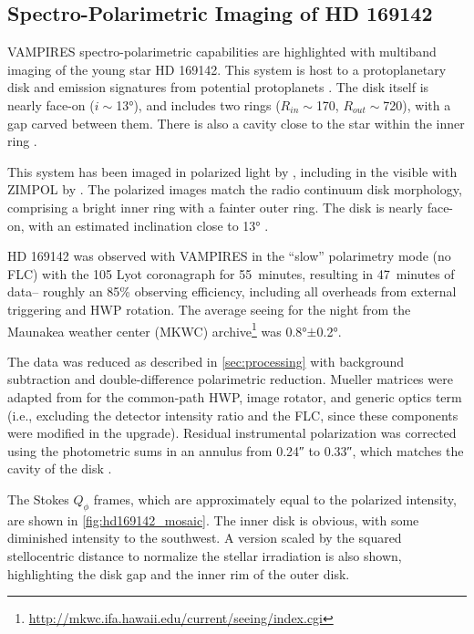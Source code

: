 \subsection{Spectro-Polarimetric Imaging of HD 169142\label{sec:hd169142}}

VAMPIRES spectro-polarimetric capabilities are highlighted with multiband imaging of the young star HD 169142. This system is host to a protoplanetary disk \citep{quanz_gaps_2013} and emission signatures from potential protoplanets \citep{hammond_confirmation_2023}. The disk itself is nearly face-on ($i{\sim}$\ang{13}), and includes two rings ($R_{in}{\sim}$\SI{170}{\mas}, $R_{out}{\sim}$\SI{720}{\mas}), with a gap carved between them. There is also a cavity close to the star within the inner ring \citep{fedele_alma_2017}.

This system has been imaged in polarized light by \citet{kuhn_imaging_2001,quanz_gaps_2013,monnier_polarized_2017,pohl_circumstellar_2017}, including in the visible with ZIMPOL by \citet{bertrang_hd_2018}. The polarized images match the radio continuum disk morphology, comprising a bright inner ring with a fainter outer ring. The disk is nearly face-on, with an estimated inclination close to \ang{13} \citep{fedele_alma_2017}.

HD 169142 was observed with VAMPIRES in the ``slow'' polarimetry mode (no FLC) with the \SI{105}{\mas} Lyot coronagraph for \SI{55}{minutes}, resulting in \SI{47}{minutes} of data-- roughly an 85\% observing efficiency, including all overheads from external triggering and HWP rotation. The average seeing for the night from the Maunakea weather center (MKWC) archive\footnote{\url{http://mkwc.ifa.hawaii.edu/current/seeing/index.cgi}} was \ang{0.8}$\pm$\ang{0.2}.

The data was reduced as described in \autoref{sec:processing} with background subtraction and double-difference polarimetric reduction. Mueller matrices were adapted from \citet{zhang_characterizing_2023} for the common-path HWP, image rotator, and generic optics term (i.e., excluding the detector intensity ratio and the FLC, since these components were modified in the upgrade). Residual instrumental polarization was corrected using the photometric sums in an annulus from \ang{;;0.24} to \ang{;;0.33}, which matches the cavity of the disk \citep{bertrang_hd_2018}.

The Stokes $Q_\phi$ frames, which are approximately equal to the polarized intensity, are shown in \autoref{fig:hd169142_mosaic}. The inner disk is obvious, with some diminished intensity to the southwest. A version scaled by the squared stellocentric distance to normalize the stellar irradiation is also shown, highlighting the disk gap and the inner rim of the outer disk.

